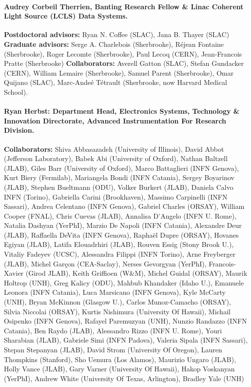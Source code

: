 \documentclass{article}
\begin{document}
\paragraph{Audrey Corbeil Therrien, Banting Research Fellow \& Linac Coherent Light Source (LCLS) Data Systems. }
\textbf{Postdoctoral advisors: } Ryan N. Coffee (SLAC), Jana B. Thayer (SLAC)
\textbf{Graduate advisors: } Serge A. Charlebois (Sherbrooke), R\'{e}jean Fontaine (Sherbrooke), Roger Lecomte (Sherbrooke), Paul Lecoq (CERN), Jean-Francois Pratte (Sherbrooke) 
\textbf{Collaborators: }
Averell Gatton (SLAC), Stefan Gundacker (CERN), William Lemaire (Sherbrooke), Samuel Parent (Sherbrooke), Omar Quijano (SLAC), Marc-Ande\'{e} T\'{e}trault (Sherbrooke, now Harvard Medical School).

\paragraph{Ryan Herbst: Department Head, Electronics Systems, Technology \& Innovation Directorate, Advanced Instrumentation For Research Division. }
\textbf{Collaborators: }
Shiva Abbasazadeh (University of Illinois), David	Abbot	(Jefferson Laboratory), Babek	Abi	(University of Oxford), Nathan	Baltzell	(JLAB), Giles	Barr	(University of Oxford), Marco	Battaglieri	(INFN Genova), Kurt	Biery	(Fermilab), Mariangela	Bondi	(INFN Catania), Sergey	Boyarinov	(JLAB), Stephen	Bueltmann	(ODU), Volker	Burkert	(JLAB), Daniela	Calvo	INFN (Torino), Gabriella	Carini	(Brookhaven), Massimo	Carpinelli	(INFN Sassari), Andrea	Celentano	(INFN Genova), Gabriel	Charles	(ORSAY), William	Cooper	(FNAL), Chris	Cuevas	(JLAB), Annalisa	D'Angelo	(INFN U. Rome), Natalia	Dashyan	(YerPhI), Marzio	De Napoli	(INFN Catania), Alexandre	Deur	(JLAB), Raffaella	DeVita	(INFN Genova), Raphaël	Dupre	(ORSAY), Hovanes	Egiyan	(JLAB), Latifa	Elouadrhiri	(JLAB), Rouven	Essig	(Stony Brook U.), Vitaliy	Fadeyev	(UCSC), Alessandra	Filippi	(INFN Torino), Arne	Freyberger	(JLAB), Michel	Garçon	(CEA-Saclay), Nerses	Gevorgyan	(YerPhI), Francois-Xavier	(Girod	JLAB), Keith	Griffioen	(W\&M), Michel	Guidal	(ORSAY), Maurik	Holtrop	(UNH), Greg	Kalicy	(ODU), Mahbub	Khandaker	(Idaho U.), Emanuele	Leonora	(INFN Catania), Luca	Marsicano	(INFN Genova), Kyle	McCarty	(UNH), Bryan	McKinnon	(Glasgow U.), Carlos	Munoz-Camacho	(ORSAY), Silvia	Niccolai	(ORSAY), Kurtis	Nishimura	(University Of Hawaii), Michail	Osipenko	(INFN Genova), Rafayel	Paremuzyan	(UNH), Nunzio	Randazzo	(INFN Catania), Ben	Raydo	(JLAB), Alessandro	Rizzo	(INFN U. Rome), Youri	Sharabian	(JLAB), Gabriele	Simi	(INFN Padova), Valeria	Sipala	(INFN Sassari), Stepan	Stepanyan	(JLAB), David	Strom	(University Of Oregon), Lauren	Thompkins	(Stanford), Sho	Uemura	(Los Alamos), Maurizio	Ungaro	(JLAB), Holly	Vance	(JLAB), Gary	Varner	(University Of Hawaii), Hakop	Voskanyan	(YerPhI), Andrew	White	(University Of Texas, Arlington), Bradley	Yale	(UNH)
\end{document}

